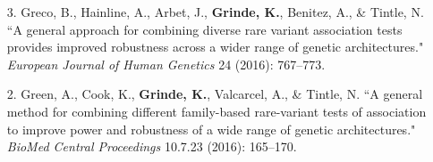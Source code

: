 \documentclass[margin]{res}
\begin{document}
\begin{resume}
\begin{itemize}
\item[3.] Greco, B., Hainline, A., Arbet, J., \textbf{Grinde, K.}, Benitez, A., \& Tintle, N. ``A general approach for combining diverse rare variant association tests provides improved robustness across a wider range of genetic architectures." \textit{European Journal of Human Genetics} 24 (2016): 767--773.
	
\item[2.] Green, A., Cook, K., \textbf{Grinde, K.}, Valcarcel, A., \& Tintle, N. ``A general method for combining different family-based rare-variant tests of association to improve power and robustness of a wide range of genetic architectures." \textit{BioMed Central Proceedings} 10.7.23 (2016): 165--170.
	

\end{itemize}
\end{resume}
\end{document}
